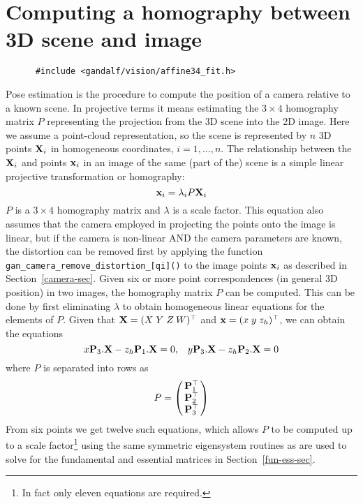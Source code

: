 \section{Computing a homography between 3D scene and image}
\begin{verbatim}
      #include <gandalf/vision/affine34_fit.h>
\end{verbatim}
Pose estimation is the procedure to compute the position of a camera relative
to a known scene. In projective terms it means estimating the $3\times 4$
homography matrix $P$ representing the projection from the 3D scene into
the 2D image. Here we assume a point-cloud representation, so
the scene is represented by $n$ 3D points $\Xvec_i$ in homogeneous
coordinates, $i=1,\ldots,n$. The relationship between the $\Xvec_i$
and points $\xvec_i$ in an image of the same (part of the) scene is a simple
linear projective transformation or homography:
\begin{equation}
 \xvec_i = \lambda_i P \Xvec_i
 \label{point-proj3D-eq}
\end{equation}
$P$ is a $3\times 4$ homography matrix and $\lambda$ is a scale factor.
This equation also assumes that the camera
employed in projecting the points onto the image is linear, but if the
camera is non-linear AND the camera parameters are known, the distortion
can be removed first by applying the function
{\tt gan\_camera\_remove\_distortion\_[qi]()} to the image points $\xvec_i$
as described in Section~\ref{camera-sec}.
Given six or more point correspondences (in general 3D position)
in two images, the homography matrix $P$ can be computed.
This can be done by first eliminating $\lambda$ to obtain homogeneous
linear equations for the elements of $P$.
Given that $\Xvec=(X\;Y\;Z\:W)\tr$ and $\xvec=(x\;y\;z_h)\tr$,
we can obtain the equations
\begin{equation}
 x \Pvec_3.\Xvec - z_h \Pvec_1.\Xvec = 0,\;\;\;
 y \Pvec_3.\Xvec - z_h \Pvec_2.\Xvec = 0
 \label{homog3D-point}
\end{equation}
where $P$ is separated into rows as
\[ P = \beginm{c} \Pvec_1\tr \\ \Pvec_2\tr \\ \Pvec_3\tr \endm
\]
From six points we get twelve such equations, which allows $P$ to be
computed up to a scale factor\footnote{In fact only eleven equations are
required.} using the same symmetric eigensystem routines
as are used to solve for the fundamental and essential matrices
in Section~\ref{fun-ess-sec}.

